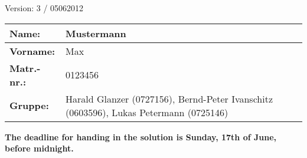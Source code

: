 \documentclass[12pt,a4paper]{uebung}
\begin{document}
\newcommand{\Vorlesung}{Formal Methods in Computer Science}
\newcommand{\Semester}{SS 2012}
\newcommand{\Prof}{Univ.~Prof.~Helmut Veith}
\newcommand{\AssisA}{Dr. Igor Konnov}
\newcommand{\AssisB}{Dr. Florian Zuleger}
\newcommand{\AssisC}{Andreas Holzer, M.Sc.}
\newcommand{\AssisD}{Moritz Sinn, M.Sc.}



\newcommand{\solution}[1]{}

\newcommand\ltlX{\textsf{\textbf{X}}\,}
\newcommand\ltlF{\textsf{\textbf{F}}\,}
\newcommand\ltlG{\textsf{\textbf{G}}\,}
\newcommand\ltlU{\,\textsf{\textbf{U}}\,}
\newcommand\ILTLX[0]{$\mbox{\textsf{ILTL}}_{\mbox{\textsf{-X}}}$}
\newcommand\LTLX[0]{$\mbox{\textsf{LTL}}_{\mbox{\textsf{-X}}}$}




\setlength{\unitlength}{1mm}
{\hfill Version: 3 / 05062012\\}
\begin{tabularx}{\textwidth}{|l|X|}
\hline
\textbf{Name:}& Mustermann \\\hline
\textbf{Vorname:}& Max\\\hline
\textbf{Matr.-nr.:}& 0123456 \\\hline
\textbf{Gruppe:}& Harald Glanzer (0727156), Bernd-Peter Ivanschitz (0603596), Lukas Petermann (0725146)  \\\hline
\end{tabularx}



\begin{center}
\textbf{The deadline for handing in the solution is Sunday, 17th of June, before midnight.}
\end{center}


\newpage

\newpage

\newpage

\newpage

\newpage

\newpage

\newpage
%
\end{document}
